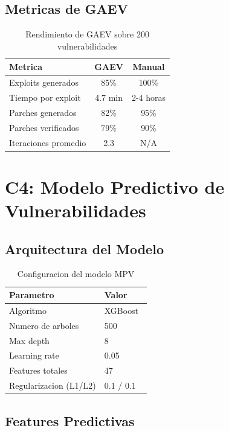 \documentclass[11pt]{article}
\theoremstyle{definition}
\theoremstyle{plain}
\theoremstyle{remark}
\begin{document}
\subsection{Metricas de GAEV}

\begin{table}[H]
\centering
\caption{Rendimiento de GAEV sobre 200 vulnerabilidades}
\label{tab:gaev_metrics}
\begin{tabular}{lcc}
\toprule
\textbf{Metrica} & \textbf{GAEV} & \textbf{Manual} \\
\midrule
Exploits generados & 85\% & 100\% \\
Tiempo por exploit & 4.7 min & 2-4 horas \\
Parches generados & 82\% & 95\% \\
Parches verificados & 79\% & 90\% \\
Iteraciones promedio & 2.3 & N/A \\
\bottomrule
\end{tabular}
\end{table}

\section{C4: Modelo Predictivo de Vulnerabilidades}
\label{sec:mpv}

\subsection{Arquitectura del Modelo}

\begin{table}[H]
\centering
\caption{Configuracion del modelo MPV}
\label{tab:mpv_config}
\begin{tabular}{ll}
\toprule
\textbf{Parametro} & \textbf{Valor} \\
\midrule
Algoritmo & XGBoost~\cite{chen2016xgboost} \\
Numero de arboles & 500 \\
Max depth & 8 \\
Learning rate & 0.05 \\
Features totales & 47 \\
Regularizacion (L1/L2) & 0.1 / 0.1 \\
\bottomrule
\end{tabular}
\end{table}

\subsection{Features Predictivas}
\end{document}
